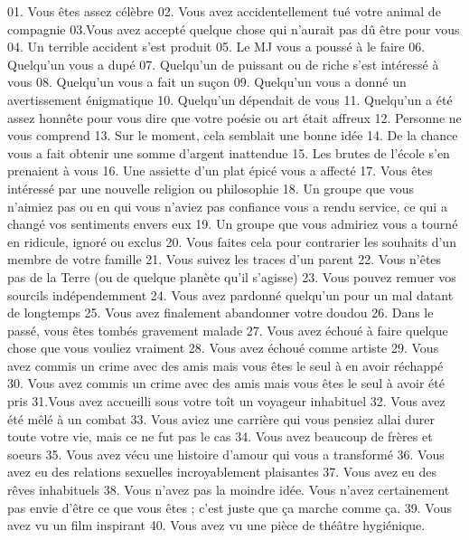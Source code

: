 
\begin{tabular}
  01. Vous êtes assez célèbre
  02. Vous avez accidentellement tué votre animal de compagnie
  03.Vous avez accepté quelque chose qui n'aurait pas dû être pour vous
  04. Un terrible accident s'est produit
  05. Le MJ vous a poussé à le faire
  06. Quelqu'un vous a dupé
  07. Quelqu'un de puissant ou de riche s'est intéressé à vous
  08. Quelqu'un vous a fait un suçon
  09. Quelqu'un vous a donné un avertissement énigmatique
  10. Quelqu'un dépendait de vous
  11. Quelqu'un a été assez honnête pour vous dire que votre poésie ou art était affreux
  12. Personne ne vous comprend
  13. Sur le moment, cela semblait une bonne idée
  14. De la chance vous a fait obtenir une somme d'argent inattendue
  15. Les brutes de l'école s'en prenaient à vous
  16. Une assiette d'un plat épicé vous a affecté
  17. Vous êtes intéressé par une nouvelle religion ou philosophie
  18. Un groupe que vous n'aimiez pas ou en qui vous n'aviez pas confiance vous a rendu service, ce qui a changé vos sentiments envers eux
  19. Un groupe que vous admiriez vous a tourné en ridicule, ignoré ou exclus
  20. Vous faites cela pour contrarier les souhaits d'un membre de votre famille
  21. Vous suivez les traces d'un parent
  22. Vous n'êtes pas de la Terre (ou de quelque planète qu'il s'agisse)
  23. Vous pouvez remuer vos sourcils indépendemment
  24. Vous avez pardonné quelqu'un pour un mal datant de longtemps
  25. Vous avez finalement abandonner votre doudou
  26. Dans le passé, vous êtes tombés gravement malade
  27. Vous avez échoué à faire quelque chose que vous vouliez vraiment
  28. Vous avez échoué comme artiste
  29. Vous avez commis un crime avec des amis mais vous êtes le seul à en avoir réchappé
  30. Vous avez commis un crime avec des amis mais vous êtes le seul à avoir été pris
  31.Vous avez accueilli sous votre toît un voyageur inhabituel
  32. Vous avez été mêlé à un combat
  33. Vous aviez une carrière qui vous pensiez allai durer toute votre vie, mais ce ne fut pas le cas
  34. Vous avez beaucoup de frères et soeurs
  35. Vous avez vécu une histoire d'amour qui vous a transformé
  36. Vous avez eu des relations sexuelles incroyablement plaisantes
  37. Vous avez eu des rêves inhabituels
  38. Vous n'avez pas la moindre idée. Vous n'avez certainement pas envie d'être ce que vous êtes ; c'est juste que ça marche comme ça.
  39. Vous avez vu un film inspirant
  40. Vous avez vu une pièce de théâtre hygiénique.

\end{tabular}
